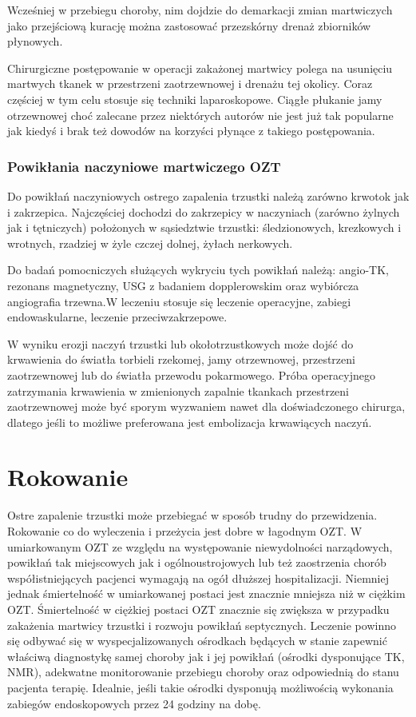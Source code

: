 \documentclass[a4paper, 12pt]{report}
\begin{document}
Wcześniej w przebiegu choroby, nim dojdzie do demarkacji zmian
martwiczych jako przejściową kurację można zastosować przezskórny
drenaż zbiorników płynowych. 

Chirurgiczne postępowanie w operacji zakażonej martwicy polega na
usunięciu martwych tkanek w przestrzeni zaotrzewnowej i drenażu tej
okolicy. Coraz częściej w tym celu stosuje się techniki laparoskopowe.
Ciągłe płukanie jamy otrzewnowej choć zalecane przez niektórych autorów nie
jest już tak popularne jak kiedyś i brak też dowodów na korzyści płynące z
takiego postępowania.

\subsection*{Powikłania naczyniowe martwiczego OZT}

Do powikłań naczyniowych ostrego zapalenia trzustki należą zarówno
krwotok jak i zakrzepica. Najczęściej dochodzi do zakrzepicy w
naczyniach (zarówno żylnych jak i tętniczych) położonych w sąsiedztwie
trzustki: śledzionowych, krezkowych i wrotnych, rzadziej w żyle czczej
dolnej, żyłach nerkowych. 

Do badań pomocniczych służących wykryciu tych powikłań należą:
angio-TK, rezonans magnetyczny, USG z badaniem dopplerowskim oraz
wybiórcza angiografia trzewna.W leczeniu stosuje się leczenie
operacyjne, zabiegi endowaskularne, leczenie przeciwzakrzepowe.

W wyniku erozji naczyń trzustki lub okołotrzustkowych może dojść do
krwawienia do światła torbieli rzekomej, jamy otrzewnowej, przestrzeni
zaotrzewnowej lub do światła przewodu pokarmowego. Próba operacyjnego
zatrzymania krwawienia w zmienionych zapalnie tkankach przestrzeni
zaotrzewnowej może być sporym wyzwaniem nawet dla doświadczonego
chirurga, dlatego jeśli to możliwe preferowana jest embolizacja
krwawiących naczyń. 

\chapter{Rokowanie}

Ostre zapalenie trzustki może przebiegać w sposób trudny do
przewidzenia. Rokowanie co do wyleczenia i przeżycia jest dobre w
łagodnym OZT. W umiarkowanym OZT ze względu na występowanie
niewydolności narządowych, powikłań tak miejscowych jak i
ogólnoustrojowych lub też zaostrzenia chorób współistniejących
pacjenci wymagają na ogół dłuższej hospitalizacji. Niemniej jednak
śmiertelność w umiarkowanej postaci jest znacznie mniejsza niż w
ciężkim OZT. Śmiertelność w ciężkiej postaci OZT znacznie się zwiększa
w przypadku zakażenia martwicy trzustki i rozwoju powikłań
septycznych. Leczenie powinno się odbywać się w wyspecjalizowanych
ośrodkach będących w stanie zapewnić właściwą diagnostykę samej
choroby jak i jej powikłań (ośrodki dysponujące TK, NMR), adekwatne
monitorowanie przebiegu choroby oraz odpowiednią do stanu pacjenta
terapię. Idealnie, jeśli takie ośrodki dysponują możliwością wykonania
zabiegów endoskopowych przez 24 godziny na dobę.
\end{document}
